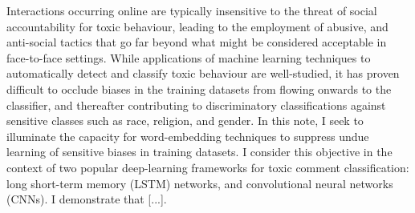 Interactions occurring online are typically insensitive to the threat of social accountability for toxic behaviour, leading to the employment of abusive, and anti-social tactics that go far beyond what might be considered acceptable in face-to-face settings. 
While applications of machine learning techniques to automatically detect and classify toxic behaviour are well-studied, it has proven difficult to occlude biases in the training datasets from flowing onwards to the classifier, and thereafter contributing to discriminatory classifications against sensitive classes such as race, religion, and gender. 
In this note, I seek to illuminate the capacity for word-embedding techniques to suppress undue learning of sensitive biases in training datasets. 
I consider this objective in the context of two popular deep-learning frameworks for toxic comment classification: long short-term memory (LSTM) networks, and convolutional neural networks (CNNs). I demonstrate that [...].

